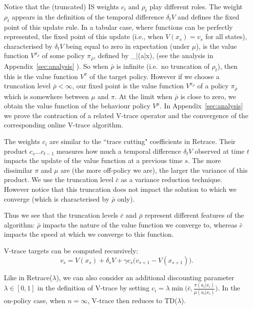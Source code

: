 Notice that the (truncated) IS weights $c_i$ and $\rho_t$ play different roles.  The weight $\rho_t$ appears in the definition of the temporal difference $\delta_t V$ and defines the fixed point of this update rule. In a tabular case, where functions can be perfectly represented, the fixed point of this update (i.e., when $V(x_s)=v_s$ for all states), characterised by $\delta_t V$ being equal to zero in expectation (under $\mu$), is the value function $V^{\pi_{\bar \rho}}$ of some policy $\pi_{\bar \rho}$, defined by
 \beq\label{eq:pi_rho}
 \pi_{\bar \rho}(a|x)\eqdef {},
 \eeq
  (see the analysis in Appendix~\ref{sec:analysis}
).
So when $\bar \rho$ is infinite (i.e.~no truncation of $\rho_t$), then this is the value function $V^{\pi}$ of the target policy.  However if we choose a truncation level $\bar \rho<\infty$, our fixed point is the value function $V^{\pi_{\bar \rho}}$ of a policy $\pi_{\bar\rho}$ which is somewhere between $\mu$ and $\pi$. At the limit when $\bar \rho$ is close to zero, we obtain the value function of the behaviour policy $V^{\mu}$. In Appendix~\ref{sec:analysis}
we prove the contraction of a related V-trace operator and the convergence of the corresponding online V-trace algorithm.

The weights $c_i$ are similar to the ``trace cutting" coefficients in Retrace. Their product $c_s\dots c_{t-1}$ measures how much a temporal difference $\delta_tV$ observed at time $t$ impacts the update of the value function at a previous time $s$. The more dissimilar $\pi$ and $\mu$ are (the more off-policy we are), the larger the variance of this product. We use the truncation level $\bar c$ as a variance reduction technique. However notice that this truncation does not impact the solution to which we converge (which is characterised by $\bar \rho$ only).

Thus we see that the truncation levels $\bar c$ and $\bar \rho$ represent different features of the algorithm:  $\bar \rho$ impacts the nature of the value function we converge to, whereas $\bar c$ impacts the speed at which we converge to this function.
 
\begin{remark}
V-trace targets can be computed recursively:
$$v_s = V(x_s) + \delta_sV + \gamma c_s\big( v_{s+1} - V(x_{s+1})\big).$$
\end{remark}
\begin{remark}
Like in Retrace($\lambda$), we can also consider an additional discounting parameter $\lambda\in [0,1]$ in the definition of V-trace by setting $c_i=\lambda\min\big(\bar c, \frac{\pi(a_i|x_i)}{\mu(a_i|x_i)}\big)$. In the on-policy case, when $n=\infty$, V-trace then reduces to TD($\lambda$).
\end{remark}

